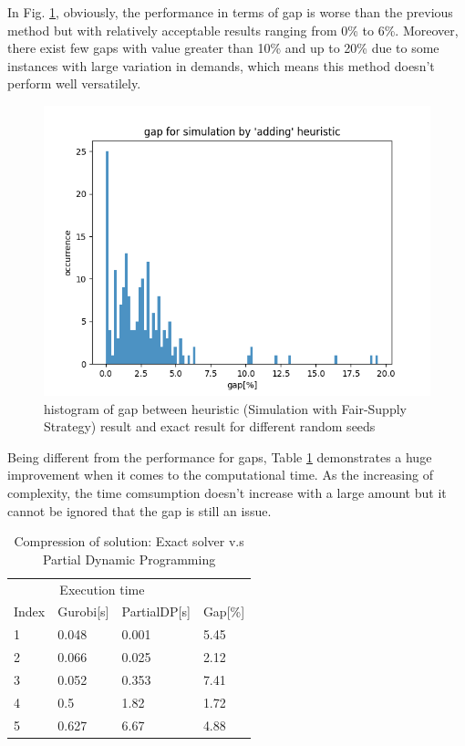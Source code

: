 \documentclass{article}
\begin{document}
In Fig. \ref{fig:hist_so}, obviously, the performance in terms of gap is worse than the previous method but with relatively acceptable results ranging from 0\% to 6\%. Moreover, there exist few gaps with value greater than 10\% and up to 20\% due to some instances with large variation in demands, which means this method doesn't perform well versatilely.

\begin{figure}[ht]
    \centering
    \includegraphics[scale=0.7]{hist_so.png}
    \caption{histogram of gap between heuristic (Simulation with Fair-Supply Strategy) result and exact result for different random seeds}
    \label{fig:hist_so}
\end{figure}

Being different from the performance for gaps, Table \ref{tab:exact_heu2} demonstrates a huge improvement when it comes to the computational time. As the increasing of complexity, the time comsumption doesn't increase with a large amount but it cannot be ignored that the gap is still an issue.

\begin{table}[ht]
 \caption{Compression of solution: Exact solver v.s Partial Dynamic Programming}
  \centering
  \begin{tabular}{llll}
    \toprule
    \multicolumn{3}{c}{Execution time}                   \\
    \cmidrule(r){2-3}
    Index   & Gurobi[s]     & PartialDP[s]      & Gap[\%] \\
    \midrule
    1	&	0.048	&	0.001	&	5.45	\\
    2	&	0.066	&	0.025	&	2.12	\\
    3	&	0.052	&	0.353	&	7.41	\\
    4	&	0.5	&	1.82	&	1.72	\\
    5	&	0.627	&	6.67	&	4.88	\\
    \bottomrule
  \end{tabular}
  \label{tab:exact_heu2}
\end{table}
\end{document}
